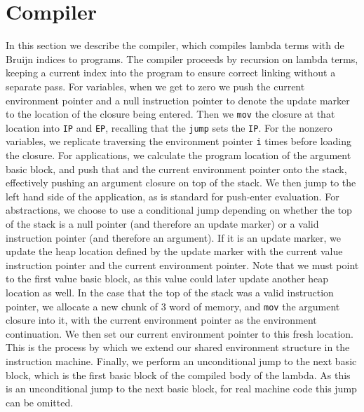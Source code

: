 \section{Compiler} \label{sec:compiler}

In this section we describe the compiler, which compiles lambda terms with
de Bruijn indices to programs. The compiler proceeds by recursion on lambda
terms, keeping a current index into the program to ensure correct linking
without a separate pass. For variables, when we get to zero we push the current
environment pointer and a null instruction pointer to denote the update marker
to the location of the closure being entered. Then we \texttt{mov} the closure
at that location into \texttt{IP} and \texttt{EP}, recalling that the
\texttt{jump} sets the \texttt{IP}. For the nonzero variables, we replicate
traversing the environment pointer \texttt{i} times before loading the closure.
For applications, we calculate the program location of the argument basic block,
and push that and the current environment pointer onto the stack, effectively
pushing an argument closure on top of the stack. We then jump to the left hand
side of the application, as is standard for push-enter evaluation. For
abstractions, we choose to use a conditional jump depending on whether the top
of the stack is a null pointer (and therefore an update marker) or a valid
instruction pointer (and therefore an argument). If it is an update marker, we
update the heap location defined by the update marker with the current value
instruction pointer and the current environment pointer.  Note that we must
point to the first value basic block, as this value could later update another
heap location as well. In the case that the top of the stack was a valid
instruction pointer, we allocate a new chunk of 3 word of memory, and
\texttt{mov} the argument closure into it, with the current environment pointer
as the environment continuation. We then set our current environment pointer to
this fresh location. This is the process by which we extend our shared
environment structure in the instruction machine. Finally, we perform an
unconditional jump to the next basic block, which is the first basic block of
the compiled body of the lambda. As this is an unconditional jump to the next
basic block, for real machine code this jump can be omitted. 


